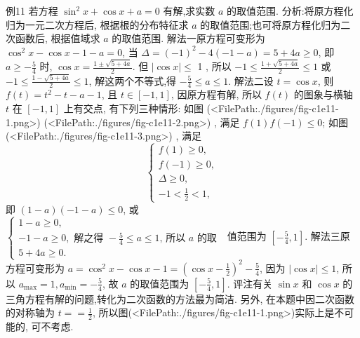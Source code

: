 例11 若方程 $\sin ^2 x+\cos x+a=0$ 有解,求实数 $a$ 的取值范围.
分析:将原方程化归为一元二次方程后, 根据根的分布特征求 $a$ 的取值范围;也可将原方程化归为二次函数后, 根据值域求 $a$ 的取值范围.
解法一原方程可变形为 $\cos ^2 x-\cos x-1-a=0$, 当 $\Delta=(-1)^2- 4(-1-a)=5+4 a \geqslant 0$, 即 $a \geqslant-\frac{5}{4}$ 时, $\cos x=\frac{1 \pm \sqrt{5+4 a}}{2}$. 但 $|\cos x| \leqslant$ 1 , 所以 $-1 \leqslant \frac{1+\sqrt{5+4 a}}{2} \leqslant 1$ 或 $-1 \leqslant \frac{1-\sqrt{5+4 a}}{2} \leqslant 1$, 解这两个不等式,得 $-\frac{5}{4} \leqslant a \leqslant 1$.
解法二设 $t=\cos x$, 则 $f(t)=t^2-t-a-1$, 且 $t \in[-1,1]$, 因原方程有解, 所以 $f(t)$ 的图象与横轴 $t$ 在 $[-1,1]$ 上有交点, 有下列三种情形:
如图 (<FilePath:./figures/fig-c1e11-1.png>) (<FilePath:./figures/fig-c1e11-2.png>) , 满足 $f(1) f(-1) \leqslant 0$;
如图 (<FilePath:./figures/fig-c1e11-3.png>) , 满足
$$
\left\{\begin{array}{l}
f(1) \geqslant 0, \\
f(-1) \geqslant 0, \\
\Delta \geqslant 0, \\
-1<\frac{1}{2}<1,
\end{array}\right.
$$
即 $(1-a)(-1-a) \leqslant 0$, 或 $\left\{\begin{array}{l}1-a \geqslant 0, \\ -1-a \geqslant 0, \text { 解之得 }-\frac{5}{4} \leqslant a \leqslant 1 \text {, 所以 } a \text { 的取 } \\ 5+4 a \geqslant 0 .\end{array}\right.$ 值范围为 $\left[-\frac{5}{4}, 1\right]$.
解法三原方程可变形为 $a=\cos ^2 x-\cos x-1=\left(\cos x-\frac{1}{2}\right)^2-\frac{5}{4}$, 因为 $|\cos x| \leqslant 1$, 所以 $a_{\max }=1, a_{\min }=-\frac{5}{4}$, 故 $a$ 的取值范围为 $\left[-\frac{5}{4}, 1\right]$.
评注有关 $\sin x$ 和 $\cos x$ 的三角方程有解的问题,转化为二次函数的方法最为简洁.
另外, 在本题中因二次函数的对称轴为 $t==\frac{1}{2}$, 所以图(<FilePath:./figures/fig-c1e11-1.png>)实际上是不可能的, 可不考虑.



